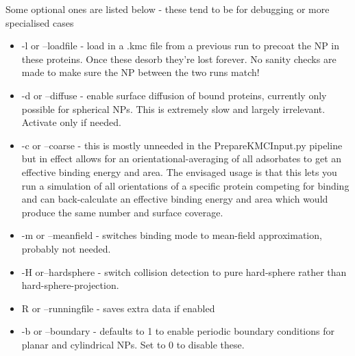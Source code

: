\documentclass[10pt,a4paper,onecolumn]{report}
\begin{document}
Some optional ones are listed below - these tend to be for debugging or more specialised cases 
 
 \begin{itemize}
\item -l or --loadfile - load in a .kmc file from a previous run to precoat the NP in these proteins. Once these desorb they're lost forever. No sanity checks are made to make sure the NP between the two runs match!
\item -d or --diffuse - enable surface diffusion of bound proteins, currently only possible for spherical NPs. This is extremely slow and largely irrelevant. Activate only if needed.
\item -c or --coarse - this is mostly unneeded in the PrepareKMCInput.py pipeline but in effect allows for an orientational-averaging of all adsorbates to get an effective binding energy and area. The envisaged usage is that this lets you run a simulation of all orientations of a specific protein competing for binding and can back-calculate an effective binding energy and area which would produce the same number and surface coverage.
\item -m or --meanfield - switches binding mode to mean-field approximation, probably not needed.
\item  -H or--hardsphere - switch collision detection to pure hard-sphere rather than hard-sphere-projection.
\item  R or --runningfile - saves extra data if enabled
\item -b or --boundary - defaults to 1 to enable periodic boundary conditions for planar and cylindrical NPs. Set to 0 to disable these. 
\end{itemize}
\end{document}
